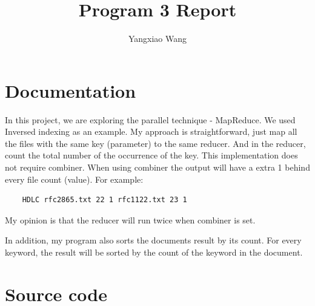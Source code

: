 \documentclass[11pt, letterpaper]{article}
\title{\textbf{Program 3 Report}}
\author{Yangxiao Wang}
\date{ }
\begin{document}
	
	\maketitle
	
	\tableofcontents
	\pagebreak
	
	\section{Documentation}
	In this project, we are exploring the parallel technique - MapReduce. We used Inversed indexing as an example. My approach is straightforward, just map all the files with the same key (parameter) to the same reducer. And in the reducer, count the total number of the occurrence of the key. This implementation does not require combiner. When using combiner the output will have a extra 1 behind every file count (value). For example: 
	\begin{lstlisting}
	HDLC rfc2865.txt 22 1 rfc1122.txt 23 1
	\end{lstlisting}
	My opinion is that the reducer will run twice when combiner is set. \par
	In addition, my program also sorts the documents result by its count. For every keyword, the result will be sorted by the count of the keyword in the document.
	
	\section {Source code}
\end{document}
